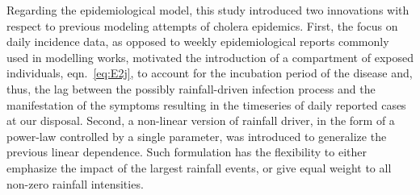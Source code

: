 Regarding the epidemiological model, this study introduced two innovations with respect to previous modeling attempts of cholera epidemics\cite{Bertuzzo:ProbabilityExtinctionHaiti:2016,Pasetto:RealtimeProjectionsCholera:2017}. First, the focus on daily incidence data, as opposed to weekly epidemiological reports commonly used in modelling works, motivated the introduction of a compartment of exposed individuals, eqn.~\eqref{eq:E2j}, to account for the incubation period of the disease and, thus, the lag between the possibly rainfall-driven infection process and the manifestation of the symptoms resulting in the timeseries of daily reported cases at our disposal. %
Second, a non-linear version of rainfall driver, in the form of a power-law controlled by a single parameter, was introduced to generalize the previous linear dependence. Such formulation has the flexibility to either emphasize the impact of the largest rainfall events, or give equal weight to all non-zero rainfall intensities. %


